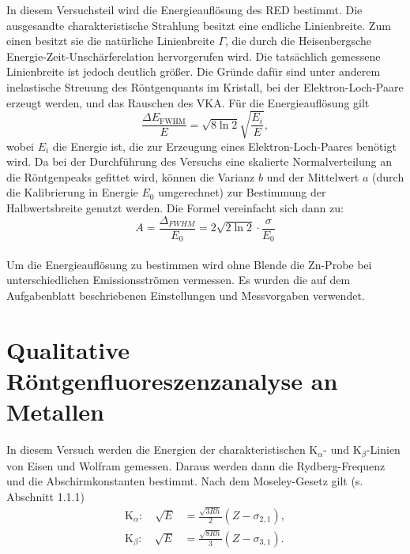 In diesem Versuchsteil wird die Energieauflösung des RED bestimmt. Die ausgesandte charakteristische Strahlung besitzt eine endliche Linienbreite. Zum einen besitzt sie die natürliche Linienbreite $\Gamma$, die durch die Heisenbergsche Energie-Zeit-Unschärferelation hervorgerufen wird.
Die tatsächlich gemessene Linienbreite ist jedoch deutlich größer. Die Gründe dafür sind unter anderem inelastische Streuung des Röntgenquants im Kristall, bei der Elektron-Loch-Paare erzeugt werden, und das Rauschen des VKA.
Für die Energieauflösung gilt \cite{litmap} %
\begin{equation}
 \frac{\Delta E_{\textrm{FWHM}}}{E} = \sqrt{8\ln2}\sqrt{\frac{E_{i}}{E}},
\end{equation}
wobei $E_{i}$ die Energie ist, die zur Erzeugung eines Elektron-Loch-Paares benötigt wird. Da bei der Durchführung des Versuchs eine skalierte Normalverteilung an die Röntgenpeaks gefittet wird, können die Varianz $b$ und der Mittelwert $a$ (durch die Kalibrierung in Energie $E_0$ umgerechnet) zur Bestimmung der Halbwertsbreite genutzt werden. Die Formel vereinfacht sich dann zu:
\begin{equation}
	A = \frac{\Delta_{FWHM}}{E_0} = 2\sqrt{2\ln 2}\cdot\frac{\sigma}{E_0}
	\label{eq:aufloesung}
\end{equation}\\
Um die Energieauflösung zu bestimmen wird ohne Blende die Zn-Probe bei unterschiedlichen Emissionsströmen vermessen. Es wurden die auf dem Aufgabenblatt beschriebenen Einstellungen und Messvorgaben verwendet.\\

\section{Qualitative Röntgenfluoreszenzanalyse an Metallen}

In diesem Versuch werden die Energien der charakteristischen K$_{\alpha}$- und K$_{\beta}$-Linien von Eisen und Wolfram gemessen. Daraus werden dann die Rydberg-Frequenz und die Abschirmkonstanten bestimmt.
Nach dem Moseley-Gesetz gilt (s. Abschnitt 1.1.1)
\begin{align}
 \textrm{K}_{\alpha}: \quad \sqrt{E} &= \frac{\sqrt{3Rh}}{2}\left(Z-\sigma_{2,1}\right), \\ 
 \textrm{K}_{\beta}: \quad \sqrt{E} &= \frac{\sqrt{8Rh}}{3}\left(Z-\sigma_{3,1}\right).
\end{align}

